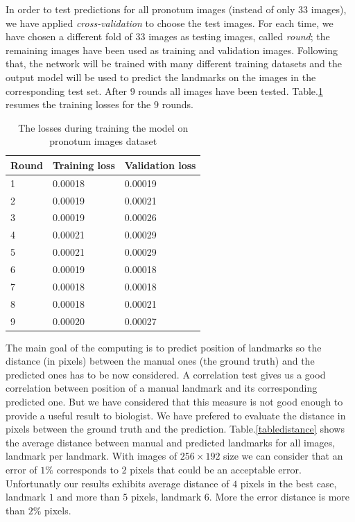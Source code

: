 \documentclass[10pt]{article}
\begin{document}
In order to test predictions for all pronotum images (instead of only $33$ images),
we have applied \textit{cross-validation} to choose the test images. For each time,
we have chosen a different fold of $33$ images as testing images, called \textit{round};
the remaining images have been used as training and validation images. Following that, the network will be trained with many
different training datasets and the output model will be used to
predict the landmarks on the images in the corresponding test
set. After $9$ rounds all images have been
tested. Table.\ref{tbltrainingloss} resumes the training losses for
the $9$ rounds.

\begin{table}[h!]
	\centering
	\begin{tabular}{l l l}
	Round & Training loss & Validation loss \\ \hline
	1 & 0.00018 & 0.00019  \\ \hline
	2 & 0.00019 & 0.00021 \\ \hline
	3 & 0.00019 & 0.00026 \\ \hline
	4 & 0.00021 & 0.00029 \\ \hline
	5 & 0.00021 & 0.00029 \\ \hline
	6 & 0.00019 & 0.00018 \\ \hline
	7 & 0.00018 & 0.00018 \\ \hline
	8 & 0.00018 & 0.00021 \\ \hline
	9 & 0.00020 & 0.00027 \\ \hline
	\end{tabular}
	\caption{\small{The losses during training the model on pronotum images dataset}}
	\label{tbltrainingloss}
\end{table}

The main goal of the computing is to predict position of landmarks so
the distance (in pixels) between the manual ones (the ground truth)
and the predicted ones has to be now considered. A correlation test
gives us a good correlation between position of a manual landmark and
its corresponding predicted one. But we have considered that this
measure is not good enough to provide a useful result to biologist. We
have prefered to evaluate the distance in pixels between the ground
truth and the prediction. Table.\ref{tabledistance} shows the
average distance between manual and predicted landmarks for all
images, landmark per landmark. With images of $256 \times 192$ size we
can consider that an error of $1\%$ corresponds to $2$ pixels that
could be an acceptable error. Unfortunatly our results exhibits
average distance of $4$ pixels in the best case, landmark $1$ and more
than $5$ pixels, landmark $6$. More the error distance is more than  $2\%$
pixels.
\end{document}
